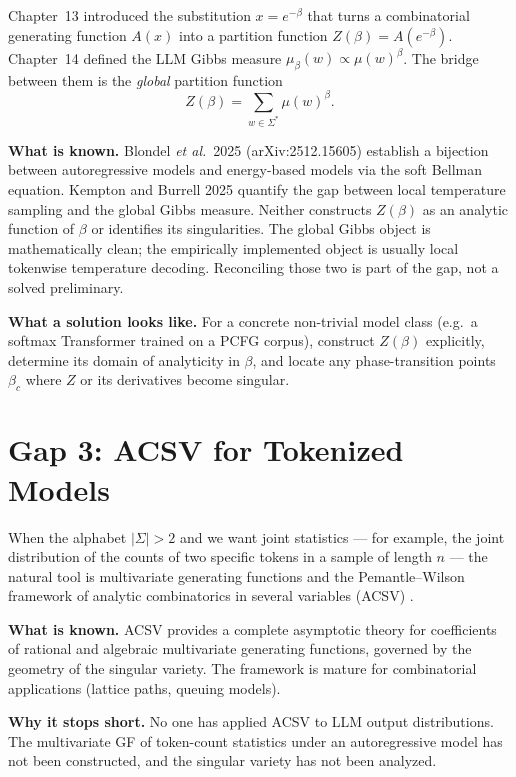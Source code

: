 Chapter~13 introduced the substitution $x=e^{-\beta}$ that turns a combinatorial generating function $A(x)$ into a partition function $Z(\beta)=A(e^{-\beta})$. Chapter~14 defined the LLM Gibbs measure $\mu_\beta(w)\propto\mu(w)^\beta$. The bridge between them is the \emph{global} partition function
$$
Z(\beta)=\sum_{w\in\Sigma^*}\mu(w)^\beta.
$$

\textbf{What is known.} Blondel \emph{et al.}\ 2025 \cite{BlondelEtAl2025} (arXiv:2512.15605) establish a bijection between autoregressive models and energy-based models via the soft Bellman equation. Kempton and Burrell 2025 \cite{KemptonBurrell2025} quantify the gap between local temperature sampling and the global Gibbs measure. Neither constructs $Z(\beta)$ as an analytic function of $\beta$ or identifies its singularities.
The global Gibbs object is mathematically clean; the empirically implemented object is usually local tokenwise temperature decoding. Reconciling those two is part of the gap, not a solved preliminary.

\textbf{What a solution looks like.} For a concrete non-trivial model class (e.g.\ a softmax Transformer trained on a PCFG corpus), construct $Z(\beta)$ explicitly, determine its domain of analyticity in $\beta$, and locate any phase-transition points $\beta_c$ where $Z$ or its derivatives become singular.

\section{Gap 3: ACSV for Tokenized Models}
\label{ch18:gap3}

When the alphabet $|\Sigma|>2$ and we want joint statistics --- for example, the joint distribution of the counts of two specific tokens in a sample of length $n$ --- the natural tool is multivariate generating functions and the Pemantle--Wilson framework of analytic combinatorics in several variables (ACSV) \cite{PemantleWilson2013}.

\textbf{What is known.} ACSV provides a complete asymptotic theory for coefficients of rational and algebraic multivariate generating functions, governed by the geometry of the singular variety. The framework is mature for combinatorial applications (lattice paths, queuing models).

\textbf{Why it stops short.} No one has applied ACSV to LLM output distributions. The multivariate GF of token-count statistics under an autoregressive model has not been constructed, and the singular variety has not been analyzed.

